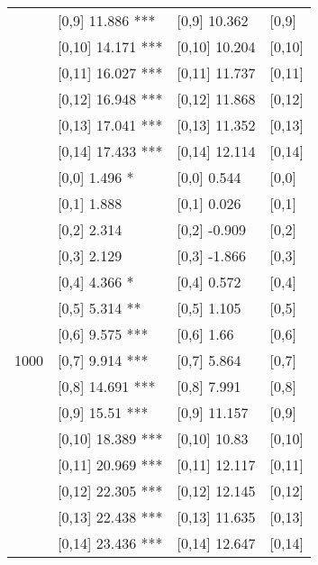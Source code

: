 \begin{table}
\begin{tabular}[t]{llll}
 & {}[0,9] 11.886 *** & {}[0,9] 10.362 & {}[0,9]\\
\addlinespace
 & {}[0,10] 14.171 *** & {}[0,10] 10.204 & {}[0,10]\\
 & {}[0,11] 16.027 *** & {}[0,11] 11.737 & {}[0,11]\\
 & {}[0,12] 16.948 *** & {}[0,12] 11.868 & {}[0,12]\\
 & {}[0,13] 17.041 *** & {}[0,13] 11.352 & {}[0,13]\\
 & {}[0,14] 17.433 *** & {}[0,14] 12.114 & {}[0,14]\\
\addlinespace
 & {}[0,0] 1.496 * & {}[0,0] 0.544 & {}[0,0]\\
 & {}[0,1] 1.888 & {}[0,1] 0.026 & {}[0,1]\\
 & {}[0,2] 2.314 & {}[0,2] -0.909 & {}[0,2]\\
 & {}[0,3] 2.129 & {}[0,3] -1.866 & {}[0,3]\\
 & {}[0,4] 4.366 * & {}[0,4] 0.572 & {}[0,4]\\
\addlinespace
 & {}[0,5] 5.314 ** & {}[0,5] 1.105 & {}[0,5]\\
 & {}[0,6] 9.575 *** & {}[0,6] 1.66 & {}[0,6]\\
1000 & {}[0,7] 9.914 *** & {}[0,7] 5.864 & {}[0,7]\\
 & {}[0,8] 14.691 *** & {}[0,8] 7.991 & {}[0,8]\\
 & {}[0,9] 15.51 *** & {}[0,9] 11.157 & {}[0,9]\\
\addlinespace
 & {}[0,10] 18.389 *** & {}[0,10] 10.83 & {}[0,10]\\
 & {}[0,11] 20.969 *** & {}[0,11] 12.117 & {}[0,11]\\
 & {}[0,12] 22.305 *** & {}[0,12] 12.145 & {}[0,12]\\
 & {}[0,13] 22.438 *** & {}[0,13] 11.635 & {}[0,13]\\
 & {}[0,14] 23.436 *** & {}[0,14] 12.647 & {}[0,14]\\
\bottomrule
\end{tabular}
\end{table}
